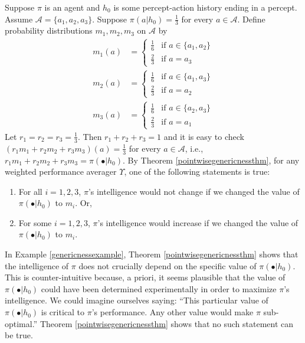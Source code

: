 \documentclass[runningheads]{llncs}
\begin{document}
\begin{example}
\label{genericnessexample}
    Suppose $\pi$ is an agent and $h_0$ is some percept-action history ending in a
    percept. Assume $\mathcal A=\{a_1,a_2,a_3\}$.
    Suppose $\pi(a|h_0)=\frac13$ for every $a\in\mathcal A$.
    Define probability distributions $m_1,m_2,m_3$ on $\mathcal A$ by
    \begin{align*}
        m_1(a) &=
        \begin{cases}
            \frac16 &\mbox{if $a\in\{a_1,a_2\}$}\\
            \frac23 &\mbox{if $a=a_3$}
        \end{cases}\\
        m_2(a) &=
        \begin{cases}
            \frac16 &\mbox{if $a\in\{a_1,a_3\}$}\\
            \frac23 &\mbox{if $a=a_2$}
        \end{cases}\\
        m_3(a) &=
        \begin{cases}
            \frac16 &\mbox{if $a\in\{a_2,a_3\}$}\\
            \frac23 &\mbox{if $a=a_1$}
        \end{cases}
    \end{align*}
    Let $r_1=r_2=r_3=\frac13$. Then $r_1+r_2+r_3=1$ and
    it is easy to check
    $(r_1m_1+r_2m_2+r_3m_3)(a)=\frac13$ for every $a\in\mathcal A$,
    i.e., $r_1m_1+r_2m_2+r_3m_3=\pi(\bullet|h_0)$.
    By Theorem \ref{pointwisegenericnessthm},
    for any weighted performance averager $\Upsilon$,
    one of the following statements is true:
    \begin{enumerate}
        \item
        For all $i=1,2,3$, $\pi$'s intelligence would not change if we
        changed the value of $\pi(\bullet|h_0)$ to $m_i$. Or,
        \item
        For some $i=1,2,3$, $\pi$'s intelligence would increase if
        we changed the value of $\pi(\bullet|h_0)$ to $m_i$.
    \end{enumerate}
\end{example}

In Example \ref{genericnessexample}, Theorem \ref{pointwisegenericnessthm} shows
that the intelligence of $\pi$ does not crucially depend on the specific value
of $\pi(\bullet|h_0)$. This is counter-intuitive because, a priori, it seems
plausible that the value of $\pi(\bullet|h_0)$ could have been determined
experimentally in order to maximize $\pi$'s intelligence. We could imagine ourselves
saying: ``This particular value of $\pi(\bullet|h_0)$ is critical to $\pi$'s
performance. Any other value would make $\pi$ sub-optimal.''
Theorem \ref{pointwisegenericnessthm} shows that no such statement can be true.
\end{document}
